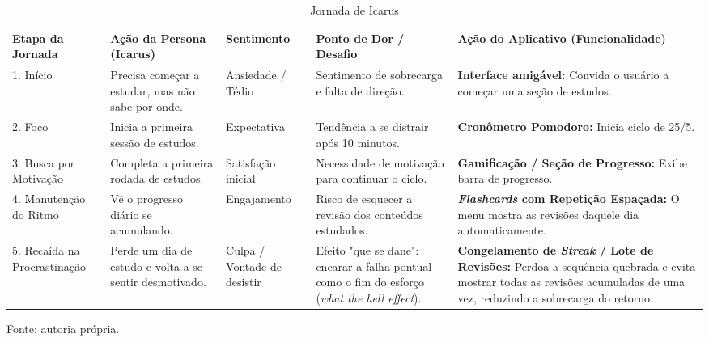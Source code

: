 \begin{table}[H]
\centering
\caption{Jornada de Icarus}
\label{tab:jornada_icarus}
\begin{tabular}{|p{2.5cm}|p{2.5cm}|p{2.8cm}|p{3cm}|p{3.5cm}|}
\hline
\textbf{Etapa da Jornada} & \textbf{Ação da Persona (Icarus)} & \textbf{Sentimento} & \textbf{Ponto de Dor / Desafio} & \textbf{Ação do Aplicativo (Funcionalidade)} \\ \hline
1. Início & Precisa começar a estudar, mas não sabe por onde. & Ansiedade / Tédio & Sentimento de sobrecarga e falta de direção. & \textbf{Interface amigável:} Convida o usuário a começar uma seção de estudos. \\ \hline
2. Foco & Inicia a primeira sessão de estudos. & Expectativa & Tendência a se distrair após 10 minutos. & \textbf{Cronômetro Pomodoro:} Inicia ciclo de 25/5. \\ \hline
3. Busca por Motivação & Completa a primeira rodada de estudos. & Satisfação inicial & Necessidade de motivação para continuar o ciclo. & \textbf{Gamificação / Seção de Progresso:} Exibe barra de progresso. \\ \hline
4. Manutenção do Ritmo & Vê o progresso diário se acumulando. & Engajamento & Risco de esquecer a revisão dos conteúdos estudados. & \textbf{\textit{Flashcards} com Repetição Espaçada:} O menu mostra as revisões daquele dia automaticamente. \\ \hline
5. Recaída na Procrastinação & Perde um dia de estudo e volta a se sentir desmotivado. & Culpa / Vontade de desistir & Efeito "que se dane": encarar a falha pontual como o fim do esforço (\textit{what the hell effect}). & \textbf{Congelamento de \textit{Streak} / Lote de Revisões:} Perdoa a sequência quebrada e evita mostrar todas as revisões acumuladas de uma vez, reduzindo a sobrecarga do retorno. \\ \hline
\end{tabular}
\par
\vspace{0.5em}
\small Fonte: autoria própria.
\end{table}

